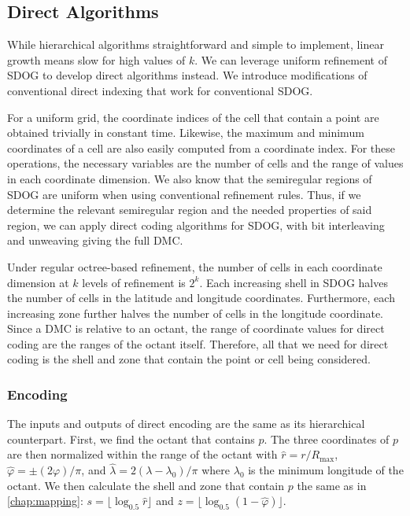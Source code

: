 \subsection{Direct Algorithms}
While hierarchical algorithms straightforward and simple to implement, linear growth means slow for high values of $k$.
We can leverage uniform refinement of SDOG to develop direct algorithms instead.
We introduce modifications of conventional direct indexing that work for conventional SDOG.%


For a uniform grid, the coordinate indices of the cell that contain a point are obtained trivially in constant time.%
Likewise, the maximum and minimum coordinates of a cell are also easily computed from a coordinate index.
For these operations, the necessary variables are the number of cells and the range of values in each coordinate dimension.
We also know that the semiregular regions of SDOG are uniform when using conventional refinement rules.
Thus, if we determine the relevant semiregular region and the needed properties of said region, we can apply direct coding algorithms for SDOG, with bit interleaving and unweaving giving the full DMC.


Under regular octree-based refinement, the number of cells in each coordinate dimension at $k$ levels of refinement is $2^k$.
Each increasing shell in SDOG halves the number of cells in the latitude and longitude coordinates.
Furthermore, each increasing zone further halves the number of cells in the longitude coordinate.
Since a DMC is relative to an octant, the range of coordinate values for direct coding are the ranges of the octant itself.
Therefore, all that we need for direct coding is the shell and zone that contain the point or cell being considered.


\subsubsection{Encoding}
The inputs and outputs of direct encoding are the same as its hierarchical counterpart.
First, we find the octant that contains $p$.
The three coordinates of $p$ are then normalized within the range of the octant with $\hat{r} = r / R_\mathrm{max}$, $\hat{\varphi} = \pm (2\varphi) / \pi$, and $\hat{\lambda} = 2 (\lambda - \lambda_0) / \pi$ where $\lambda_0$ is the minimum longitude of the octant.
We then calculate the shell and zone that contain $p$ the same as in \cref{chap:mapping}: $s = \lfloor \log_{0.5} \hat{r} \rfloor$ and $z = \lfloor \log_{0.5} ( 1 - \hat{\varphi} ) \rfloor$.


